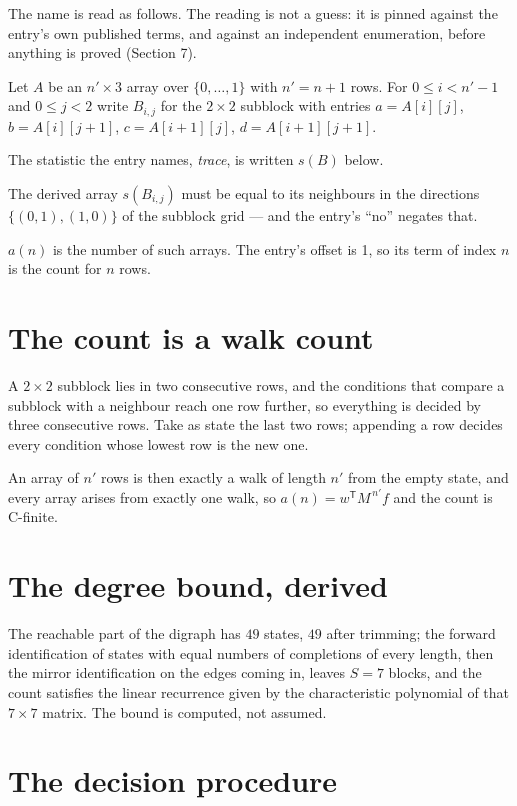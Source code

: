 \documentclass[11pt]{article}
\theoremstyle{definition}
\begin{document}
The name is read as follows. The reading is not a guess: it is pinned against the entry's own published terms, and against an independent enumeration, before anything is proved (Section 7).

Let $A$ be an $n' \times 3$ array over $\{0,\dots,1\}$ with $n' = n + 1$ rows. For $0 \le i < n'-1$ and $0 \le j < 2$ write $B_{i,j}$ for the $2\times2$ subblock with entries $a = A[i][j]$, $b = A[i][j{+}1]$, $c = A[i{+}1][j]$, $d = A[i{+}1][j{+}1]$.

The statistic the entry names, {\itshape trace}, is written $s(B)$ below.

The derived array $s(B_{i,j})$ must be equal to its neighbours in the directions $\{(0,1), (1,0)\}$ of the subblock grid --- and the entry's ``no'' negates that.

$a(n)$ is the number of such arrays. The entry's offset is 1, so its term of index $n$ is the count for $n$ rows.

\section{The count is a walk count}

A $2\times2$ subblock lies in two consecutive rows, and the conditions that compare a subblock with a neighbour reach one row further, so everything is decided by three consecutive rows. Take as state the last two rows; appending a row decides every condition whose lowest row is the new one.

An array of $n'$ rows is then exactly a walk of length $n'$ from the empty state, and every array arises from exactly one walk, so $a(n) = w^{\mathsf T}M^{\,n'}f$ and the count is C-finite.

\section{The degree bound, derived}

The reachable part of the digraph has $49$ states, $49$ after trimming; the forward identification of states with equal numbers of completions of every length, then the mirror identification on the edges coming in, leaves $S = 7$ blocks, and the count satisfies the linear recurrence given by the characteristic polynomial of that $7\times7$ matrix. The bound is computed, not assumed.

\section{The decision procedure}
\end{document}

